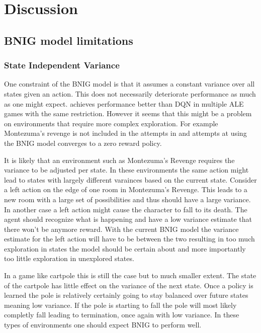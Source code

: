 \chapter{Discussion}\label{ch:disc}

\section{BNIG model limitations}

\subsection{State Independent Variance}

One constraint of the BNIG model is that it assumes a constant variance over all states given an action. This does not necessarily deteriorate performance as much as one might expect. \cite{azziz_2018} achieves performance better than DQN in multiple ALE games with the same restriction. However it seems that this might be a problem on environments that require more complex exploration. For example Montezuma's revenge is not included in the attempts in \cite{azziz_2018} and attempts at using the BNIG model converges to a zero reward policy.

It is likely that an environment such as Montezuma's Revenge requires the variance to be adjusted per state. In these environments the same action might lead to states with largely different varainces based on the current state. Consider a left action on the edge of one room in Montezuma's Revenge. This leads to a new room with a large set of possibilities and thus should have a large variance. In another case a left action might cause the character to fall to its death. The agent should recognize what is happening and have a low variance estimate that there won't be anymore reward. With the current BNIG model the variance estimate for the left action will have to be between the two resulting in too much exploration in states the model should be certain about and more importantly too little exploration in unexplored states.

In a game like cartpole this is still the case but to much smaller extent. The state of the cartpole has little effect on the variance of the next state. Once a policy is learned the pole is relatively certainly going to stay balanced over future states meaning low variance. If the pole is starting to fall the pole will most likely completly fall leading to termination, once again with low variance. In these types of environments one should expect BNIG to perform well.

